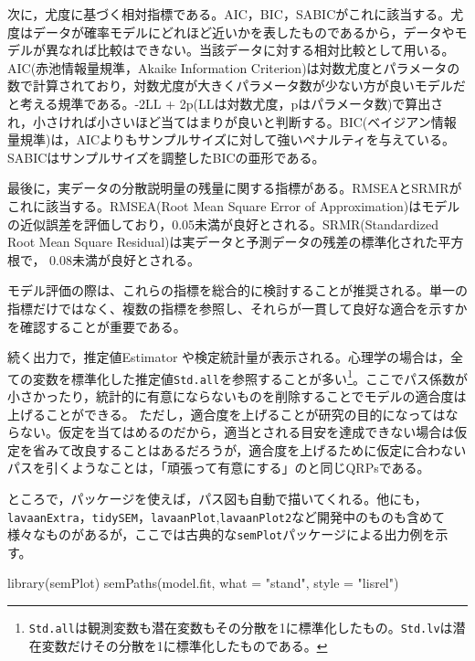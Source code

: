 \documentclass[
  a4paper,
]{ltjsbook}
\newenvironment{Shaded}{\begin{snugshade}}{\end{snugshade}}
\newcommand{\AttributeTok}[1]{\textcolor[rgb]{0.40,0.45,0.13}{#1}}
\newcommand{\FunctionTok}[1]{\textcolor[rgb]{0.28,0.35,0.67}{#1}}
\newcommand{\NormalTok}[1]{\textcolor[rgb]{0.00,0.23,0.31}{#1}}
\newcommand{\StringTok}[1]{\textcolor[rgb]{0.13,0.47,0.30}{#1}}
\begin{document}
次に，尤度に基づく相対指標である。AIC，BIC，SABICがこれに該当する。尤度はデータが確率モデルにどれほど近いかを表したものであるから，データやモデルが異なれば比較はできない。当該データに対する相対比較として用いる。AIC(赤池情報量規準，Akaike
Information
Criterion)は対数尤度とパラメータの数で計算されており，対数尤度が大きくパラメータ数が少ない方が良いモデルだと考える規準である。-2LL
+
2p(LLは対数尤度，pはパラメータ数)で算出され，小さければ小さいほど当てはまりが良いと判断する。BIC(ベイジアン情報量規準)は，AICよりもサンプルサイズに対して強いペナルティを与えている。SABICはサンプルサイズを調整したBICの亜形である。

最後に，実データの分散説明量の残量に関する指標がある。RMSEAとSRMRがこれに該当する。RMSEA(Root
Mean Square Error of
Approximation)はモデルの近似誤差を評価しており，0.05未満が良好とされる。SRMR(Standardized
Root Mean Square
Residual)は実データと予測データの残差の標準化された平方根で，
0.08未満が良好とされる。

モデル評価の際は、これらの指標を総合的に検討することが推奨される。単一の指標だけではなく、複数の指標を参照し、それらが一貫して良好な適合を示すかを確認することが重要である。

続く出力で，推定値Estimator
や検定統計量が表示される。心理学の場合は，全ての変数を標準化した推定値\texttt{Std.all}を参照することが多い\footnote{\texttt{Std.all}は観測変数も潜在変数もその分散を1に標準化したもの。\texttt{Std.lv}は潜在変数だけその分散を1に標準化したものである。}。ここでパス係数が小さかったり，統計的に有意にならないものを削除することでモデルの適合度は上げることができる。
ただし，適合度を上げることが研究の目的になってはならない。仮定を当てはめるのだから，適当とされる目安を達成できない場合は仮定を省みて改良することはあるだろうが，適合度を上げるために仮定に合わないパスを引くようなことは，「頑張って有意にする」のと同じQRPsである。

ところで，パッケージを使えば，パス図も自動で描いてくれる。他にも，\texttt{lavaanExtra}，\texttt{tidySEM}，\texttt{lavaanPlot},\texttt{lavaanPlot2}など開発中のものも含めて様々なものがあるが，ここでは古典的な\texttt{semPlot}パッケージによる出力例を示す。

\begin{Shaded}
\begin{Highlighting}[]
\FunctionTok{library}\NormalTok{(semPlot)}
\FunctionTok{semPaths}\NormalTok{(model.fit, }\AttributeTok{what =} \StringTok{"stand"}\NormalTok{, }\AttributeTok{style =} \StringTok{"lisrel"}\NormalTok{)}
\end{Highlighting}
\end{Shaded}
\end{document}

